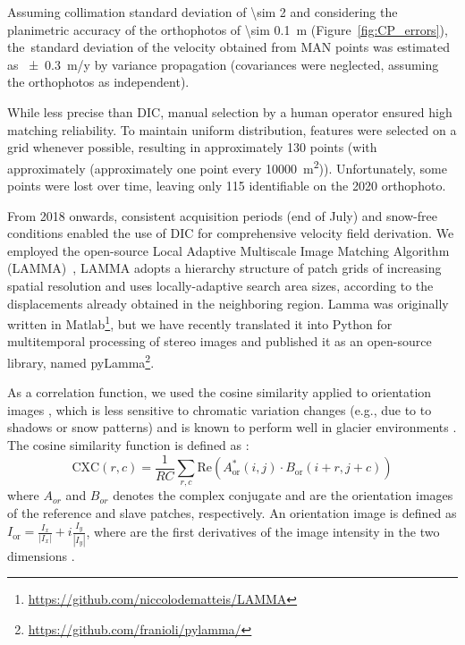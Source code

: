 Assuming collimation standard deviation of \SI{\sim 2}{\pixel} and considering the planimetric accuracy of 
the orthophotos of \SI{\sim 0.1}{\meter} (Figure~\ref{fig:CP_errors}), 
the~standard deviation of the velocity obtained from MAN points was estimated as \SI{\pm 0.3}{m/y} 
by variance propagation (covariances were neglected, assuming the orthophotos as independent).  

While less precise than DIC, manual selection by a human operator ensured high matching reliability. 
To maintain uniform distribution, features were selected on a  grid whenever possible, resulting 
in approximately 130 points (with approximately (approximately one point every \qty{10000}{\meter\squared})).  
Unfortunately, some points were lost over time, leaving only 115 identifiable on the 2020 orthophoto.

From 2018 onwards, consistent acquisition periods (end of July) and snow-free conditions enabled the use of 
DIC for comprehensive velocity field derivation. 
We employed the open-source Local Adaptive Multiscale Image Matching Algorithm (LAMMA)~\citep{Dematteis2022}, 
LAMMA adopts a hierarchy structure of patch grids of increasing spatial resolution and
uses locally-adaptive search area sizes, according to the displacements already
obtained in the neighboring region.
Lamma was originally written in Matlab\footnote{\url{https://github.com/niccolodematteis/LAMMA}}, but we have 
recently translated it into Python for multitemporal processing of stereo images \citep{ioli2024deep} and 
published it as an open-source library, named pyLamma\footnote{\url{https://github.com/franioli/pylamma/}}.

As a correlation function, we used the cosine similarity applied to orientation images \citep{Dematteis2021}, 
which is less sensitive to chromatic variation changes (e.g., due to to shadows or snow patterns) and is known 
to perform well in glacier environments \citep{Heid2012_evaluation_xcorr, Dematteis2019}.
The cosine similarity function is defined as \citep{Dematteis2022}:
\begin{equation}
\text{CXC}(r,c) = \frac{1}{RC} \sum_{r,c} \mathrm{Re} \left( A_{\text{or}}^{*}(i,j) \cdot B_{\text{or}}(i+r,j+c) \right)
\end{equation}
where $A_{or}$ and $B_{or}$ denotes the complex conjugate and are the orientation images of the 
reference and slave patches, respectively. 
An orientation image is defined as $ I_{\text{or}} = \frac{I_x}{|I_x|} + i\frac{I_y}{|I_y|} $, 
where are the first derivatives of the image intensity in the two dimensions \citep{fitch2002_OC}.

